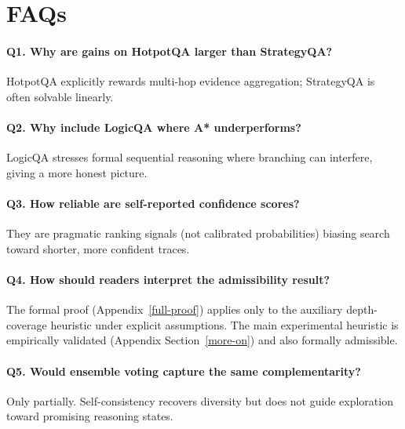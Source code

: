 \documentclass[11pt]{article}
\begin{document}
{%




\section{FAQs}
\label{app:faqs}

\paragraph{Q1. Why are gains on HotpotQA larger than StrategyQA?}
HotpotQA explicitly rewards multi-hop evidence aggregation; StrategyQA is often solvable linearly.

\paragraph{Q2. Why include LogicQA where A* underperforms?}
LogicQA stresses formal sequential reasoning where branching can interfere, giving a more honest picture.

\paragraph{Q3. How reliable are self-reported confidence scores?}
They are pragmatic ranking signals (not calibrated probabilities) biasing search toward shorter, more confident traces.

\paragraph{Q4. How should readers interpret the admissibility result?}
The formal proof (Appendix~\ref{full-proof}) applies only to the auxiliary depth-coverage heuristic under explicit assumptions. The main experimental heuristic is empirically validated (Appendix Section~\ref{more-on}) and also formally admissible.

\paragraph{Q5. Would ensemble voting capture the same complementarity?}
Only partially. Self-consistency recovers diversity but does not guide exploration toward promising reasoning states.

}
\end{document}
